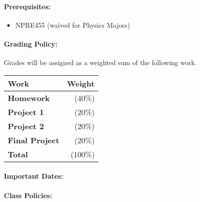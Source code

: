 \documentclass[11pt, a4paper]{article}
\begin{document}
\paragraph{Prerequisites:}
\begin{itemize}
\item NPRE455 (waived for Physics Majors)
\end{itemize}

\paragraph{Grading Policy:} Grades will be assigned as a weighted sum of the
following work.

\begin{table}[h]
\begin{tabularx}{\textwidth}{Xr}
        \textbf{Work} & \textbf{Weight} \\
\hline
\textbf{Homework}    & (40\%)  \\
\textbf{Project 1}    & (20\%)  \\
\textbf{Project 2}    & (20\%)  \\
\textbf{Final Project}  & (20\%)  \\
\hline
\textbf{Total}       & (100\%)\\
\end{tabularx}
\end{table}

\paragraph{Important Dates:}
\begin{center} \begin{minipage}{3.8in}
\begin{flushleft}
\end{flushleft}
\end{minipage}
\end{center}

\paragraph{Class Policies:}
\end{document}
